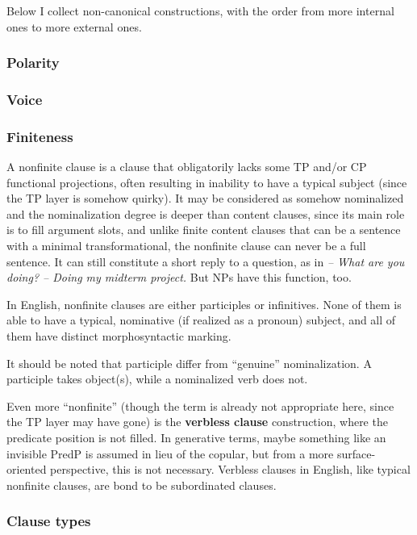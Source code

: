 \documentclass{article}
\newcommand*{\concept}[1]{\textbf{#1}}
\newcommand*{\corpus}[1]{\emph{#1}}
\begin{document}
Below I collect non-canonical constructions, with the order from more internal ones to more external ones.

\subsubsection{Polarity}



\subsubsection{Voice}\label{sec:voice}

\subsubsection{Finiteness}\label{sec:finiteness}

A nonfinite clause is a clause that obligatorily lacks some TP and/or CP functional projections,
often resulting in inability to have a typical subject (since the TP layer is somehow quirky).
It may be considered as somehow nominalized and the nominalization degree is deeper than content clauses, %
since its main role is to fill argument slots,
and unlike finite content clauses that can be a sentence with a minimal transformational,
the nonfinite clause can never be a full sentence.
It can still constitute a short reply to a question, as in 
\corpus{-- What are you doing? -- Doing my midterm project.}
But NPs have this function, too.

In English, nonfinite clauses are either participles or infinitives.
None of them is able to have a typical, nominative (if realized as a pronoun) subject,
and all of them have distinct morphosyntactic marking.

It should be noted that participle differ from ``genuine'' nominalization. %
A participle takes object(s), 
while a nominalized verb does not. 

Even more ``nonfinite'' (though the term is already not appropriate here, since the TP layer may have gone)
is the \concept{verbless clause} construction, 
where the predicate position is not filled.
In generative terms, maybe something like an invisible PredP is assumed in lieu of the copular, 
but from a more surface-oriented perspective, this is not necessary.
Verbless clauses in English, like typical nonfinite clauses, 
are bond to be subordinated clauses.

\subsubsection{Clause types}\label{sec:force}
\end{document}
